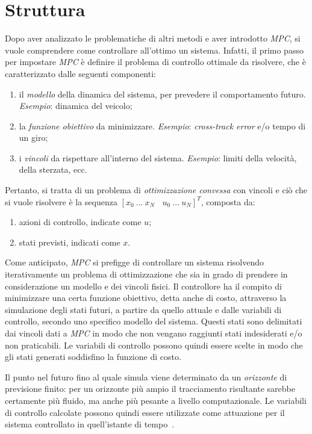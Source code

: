 \section{Struttura}
Dopo aver analizzato le problematiche di altri metodi e aver introdotto \textit{MPC}, si vuole 
comprendere come controllare all'ottimo un sistema.
Infatti, il primo passo per impostare \textit{MPC} è definire il problema di controllo ottimale
da risolvere, che è caratterizzato dalle seguenti componenti:
\begin{enumerate}
    \item il \textit{modello} della dinamica del sistema, per prevedere il comportamento futuro.
    \textit{Esempio}: dinamica del veicolo;
    \item la \textit{funzione obiettivo} da minimizzare. \textit{Esempio}: \textit{cross-track error} e/o tempo di un giro;
    \item i \textit{vincoli} da rispettare all'interno del sistema. \textit{Esempio}: limiti della velocità, della sterzata, ecc.
\end{enumerate}
Pertanto, si tratta di un problema di \textit{ottimizzazione convessa} con vincoli e ciò 
che si vuole risolvere è la sequenza $[x_0 \ ... \ x_N \ \ \ \ u_0 \ ... \ u_N]^T$, composta da:
\begin{enumerate}
    \item azioni di controllo, indicate come $u$;
    \item stati previsti, indicati come $x$.
\end{enumerate}
Come anticipato, \textit{MPC} si prefigge di controllare un sistema risolvendo iterativamente un 
problema di ottimizzazione che sia in grado di prendere in considerazione un modello e dei vincoli fisici. 
Il controllore ha il compito di minimizzare una certa funzione obiettivo, detta anche di costo, 
attraverso la simulazione degli stati futuri, a partire da quello attuale e dalle variabili di 
controllo, secondo uno specifico modello del sistema.
Questi stati sono delimitati dai vincoli dati a \textit{MPC} in modo che non vengano raggiunti stati indesiderati e/o non praticabili. 
Le variabili di controllo possono quindi essere scelte in 
modo che gli stati generati soddisfino la funzione di costo. 

Il punto nel futuro fino al quale simula viene determinato da un \textit{orizzonte} di previsione 
finito: per un orizzonte più ampio il tracciamento risultante sarebbe certamente più fluido, 
ma anche più pesante a livello computazionale.
Le variabili di controllo calcolate possono quindi essere utilizzate come attuazione per il 
sistema controllato in quell'istante di tempo~\cite{racelinecontrol}.

